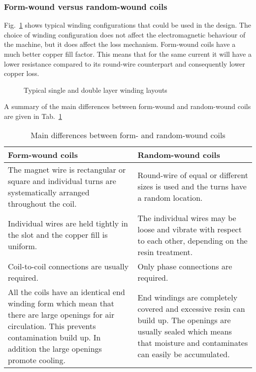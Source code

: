 \subsubsection{Form-wound versus random-wound coils}
Fig.~\ref{fig:insulation} shows typical winding configurations that could be used in the design. The choice of winding configuration does not affect the electromagnetic behaviour of the machine, but it does affect the loss mechanism. Form-wound coils have a much better copper fill factor. This means that for the same current it will have a lower resistance compared to its round-wire counterpart and consequently lower copper loss.   
\begin{figure}[htbp]
  \centering
  
  \caption{Typical single and double layer winding layouts} 
  \label{fig:insulation}
\end{figure}
A summary of the main differences between form-wound and random-wound coils are given in Tab.~\ref{tab:form_vs_round}
\begin{table}
\caption{Main differences between form- and random-wound coils}
\label{tab:form_vs_round}
\begin{tabularx}{\textwidth}{XX}
\toprule
\textbf{Form-wound coils}  & \textbf{Random-wound coils} \\\toprule
The magnet wire is rectangular or square and individual turns are systematically arranged throughout the coil. & 
Round-wire of equal or different sizes is used and the turns have a random location.\\\midrule
Individual wires are held tightly in the slot and the copper fill is uniform. &
The individual wires may be loose and vibrate with respect to each other, depending on the resin treatment.\\\midrule
Coil-to-coil connections are usually required. &
Only phase connections are required. \\\midrule
All the coils have an identical end winding form which mean that there are large openings for air circulation. This prevents contamination build up. In addition the large openings promote cooling.&
End windings are completely covered and excessive resin can build up. The openings are usually sealed which means that moisture and contaminates can easily be accumulated.  
\\\bottomrule
\end{tabularx}
\end{table}


